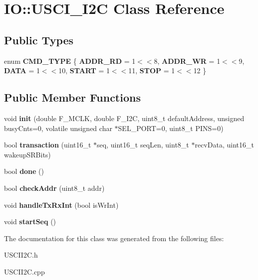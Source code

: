 \hypertarget{class_i_o_1_1_u_s_c_i___i2_c}{}\section{IO\+:\+:U\+S\+C\+I\+\_\+\+I2C Class Reference}
\label{class_i_o_1_1_u_s_c_i___i2_c}
\subsection*{Public Types}
\begin{DoxyCompactItemize}
\item 
\mbox{\label{class_i_o_1_1_u_s_c_i___i2_c_acdc4d71c6a97cbb44417281de550d7c8}} 
enum {\bfseries C\+M\+D\+\_\+\+T\+Y\+PE} \{ \newline
{\bfseries A\+D\+D\+R\+\_\+\+RD} = 1$<$$<$8, 
{\bfseries A\+D\+D\+R\+\_\+\+WR} = 1$<$$<$9, 
{\bfseries D\+A\+TA} = 1$<$$<$10, 
{\bfseries S\+T\+A\+RT} = 1$<$$<$11, 
\newline
{\bfseries S\+T\+OP} = 1$<$$<$12
 \}
\end{DoxyCompactItemize}
\subsection*{Public Member Functions}
\begin{DoxyCompactItemize}
\item 
\mbox{\label{class_i_o_1_1_u_s_c_i___i2_c_a7ec765a989cbd4ef3b6145697aecea66}} 
void {\bfseries init} (double F\+\_\+\+M\+C\+LK, double F\+\_\+\+I2C, uint8\+\_\+t default\+Address, unsigned busy\+Cnts=0, volatile unsigned char $\ast$S\+E\+L\+\_\+\+P\+O\+RT=0, uint8\+\_\+t P\+I\+NS=0)
\item 
\mbox{\label{class_i_o_1_1_u_s_c_i___i2_c_add34820575163155db117e95119c7bd7}} 
bool {\bfseries transaction} (uint16\+\_\+t $\ast$seq, uint16\+\_\+t seq\+Len, uint8\+\_\+t $\ast$recv\+Data, uint16\+\_\+t wakeup\+S\+R\+Bits)
\item 
\mbox{\label{class_i_o_1_1_u_s_c_i___i2_c_ac2c75cd3de282a82042fc72e19d344fd}} 
bool {\bfseries done} ()
\item 
\mbox{\label{class_i_o_1_1_u_s_c_i___i2_c_a21e4e5de305f5d4c7c3c7cf82067dc51}} 
bool {\bfseries check\+Addr} (uint8\+\_\+t addr)
\item 
\mbox{\label{class_i_o_1_1_u_s_c_i___i2_c_abc3339929b114e7f04448fde955f64cb}} 
void {\bfseries handle\+Tx\+Rx\+Int} (bool is\+Wr\+Int)
\item 
\mbox{\label{class_i_o_1_1_u_s_c_i___i2_c_a2781f9194474979eff5f1376cb77cef8}} 
void {\bfseries start\+Seq} ()
\end{DoxyCompactItemize}


The documentation for this class was generated from the following files\+:\begin{DoxyCompactItemize}
\item 
U\+S\+C\+I\+I2\+C.\+h\item 
U\+S\+C\+I\+I2\+C.\+cpp\end{DoxyCompactItemize}
